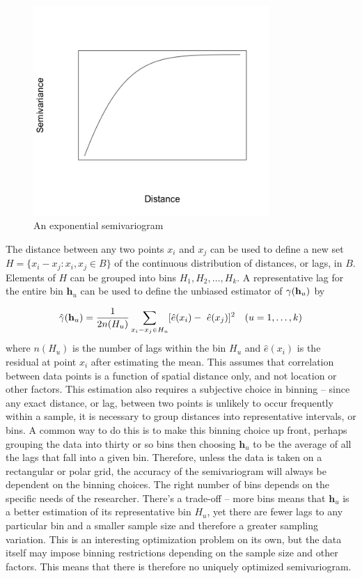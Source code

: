 \documentclass[12pt,twoside]{reedthesis}
\begin{document}
\begin{figure}[h]
    \centering
    \includegraphics[width=0.8\textwidth]{semivariogram}
    \caption{An exponential semivariogram}
    \label{fig:semivariogram}
\end{figure}

The distance between any two points $x_i$ and $x_j$ can be used to define a new set $H = \{ x_i - x_j: x_i, x_j \in B \}$ of the continuous distribution of distances, or lags, in $B$. Elements of $H$ can be grouped into bins $H_1, H_2, \dots, H_k$. A representative lag for the entire bin $\mathbf{h}_u$ can be used to define the unbiased estimator of $\gamma(\bold{h}_u)$ by

\begin{align*} 
   \hat\gamma(\bold{h}_u) = { 1 \over {2n(H_u)}} \sum_{x_i - x_j \in H_u} [ \hat e(x_i) - \
   \hat e(x_j) ] ^2 \quad (u = 1, \dots, k)
\end{align*}
where $n(H_u)$ is the number of lags within the bin $H_u$ and $\hat e(x_i)$ is the residual at point $x_i$ after estimating the mean. This assumes that correlation between data points is a function of spatial distance only, and not location or other factors. This estimation also requires a subjective choice in binning -- since any exact distance, or lag, between two points is unlikely to occur frequently within a sample, it is necessary to group distances into representative intervals, or bins. A common way to do this is to make this binning choice up front, perhaps grouping the data into thirty or so bins then choosing $\mathbf{h}_u$ to be the average of all the lags that fall into a given bin. Therefore, unless the data is taken on a rectangular or polar grid, the accuracy of the semivariogram will always be dependent on the binning choices. The right number of bins depends on the specific needs of the researcher. There's a trade-off -- more bins means that $\mathbf{h}_u$ is a better estimation of its representative bin $H_u$, yet there are fewer lags to any particular bin and a smaller sample size and therefore a greater sampling variation. This is an interesting optimization problem on its own, but the data itself may impose binning restrictions depending on the sample size and other factors. This means that there is therefore no uniquely optimized semivariogram. 
\end{document}
